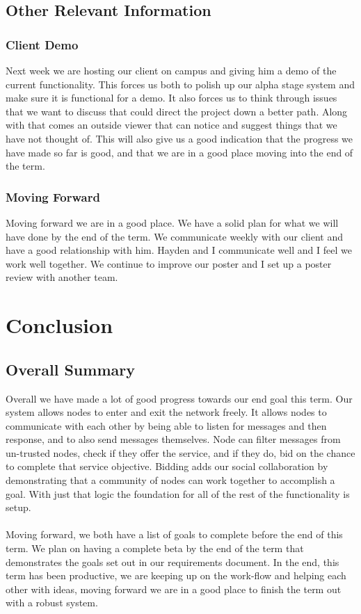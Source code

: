 \documentclass[draftclsnofoot, onecolumn, compsoc, 10pt]{IEEEtran}
\begin{document}
\subsection{Other Relevant Information}
\subsubsection{Client Demo}
Next week we are hosting our client on campus and giving him a demo of the current functionality. This forces us both to polish up our alpha stage system and make sure it is functional for a demo. It also forces us to think through issues that we want to discuss that could direct the project down a better path. Along with that comes an outside viewer that can notice and suggest things that we have not thought of. This will also give us a good indication that the progress we have made so far is good, and that we are in a good place moving into the end of the term.

\subsubsection{Moving Forward}
Moving forward we are in a good place. We have a solid plan for what we will have done by the end of the term. We communicate weekly with our client and have a good relationship with him. Hayden and I communicate well and I feel we work well together. We continue to improve our poster and I set up a poster review with another team.



\section{Conclusion}
\subsection{Overall Summary}
Overall we have made a lot of good progress towards our end goal this term. Our system allows nodes to enter and exit the network freely. It allows nodes to communicate with each other by being able to listen for messages and then response, and to also send messages themselves. Node can filter messages from un-trusted nodes, check if they offer the service, and if they do, bid on the chance to complete that service objective. Bidding adds our social collaboration by demonstrating that a community of nodes can work together to accomplish a goal. With just that logic the foundation for all of the rest of the functionality is setup. 
\\ \\
Moving forward, we both have a list of goals to complete before the end of this term. We plan on having a complete beta by the end of the term that demonstrates the goals set out in our requirements document. In the end, this term has been productive, we are keeping up on the work-flow and helping each other with ideas, moving forward we are in a good place to finish the term out with a robust system.

\end{document}
